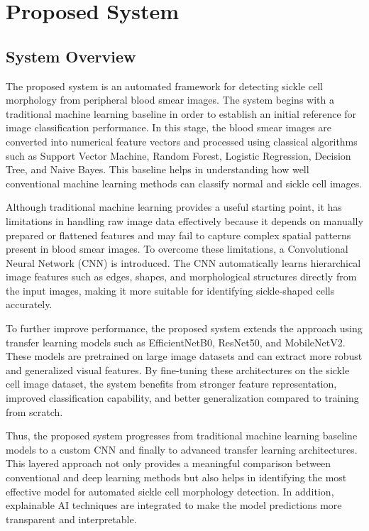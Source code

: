 
\chapter{Proposed System}

\section{System Overview}

The proposed system is an automated framework for detecting sickle cell morphology from peripheral blood smear images. The system begins with a traditional machine learning baseline in order to establish an initial reference for image classification performance. In this stage, the blood smear images are converted into numerical feature vectors and processed using classical algorithms such as Support Vector Machine, Random Forest, Logistic Regression, Decision Tree, and Naive Bayes. This baseline helps in understanding how well conventional machine learning methods can classify normal and sickle cell images.

Although traditional machine learning provides a useful starting point, it has limitations in handling raw image data effectively because it depends on manually prepared or flattened features and may fail to capture complex spatial patterns present in blood smear images. To overcome these limitations, a Convolutional Neural Network (CNN) is introduced. The CNN automatically learns hierarchical image features such as edges, shapes, and morphological structures directly from the input images, making it more suitable for identifying sickle-shaped cells accurately.

To further improve performance, the proposed system extends the approach using transfer learning models such as EfficientNetB0, ResNet50, and MobileNetV2. These models are pretrained on large image datasets and can extract more robust and generalized visual features. By fine-tuning these architectures on the sickle cell image dataset, the system benefits from stronger feature representation, improved classification capability, and better generalization compared to training from scratch.

Thus, the proposed system progresses from traditional machine learning baseline models to a custom CNN and finally to advanced transfer learning architectures. This layered approach not only provides a meaningful comparison between conventional and deep learning methods but also helps in identifying the most effective model for automated sickle cell morphology detection. In addition, explainable AI techniques are integrated to make the model predictions more transparent and interpretable.

